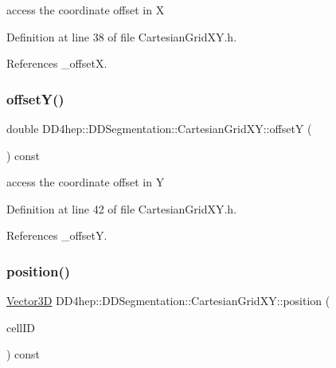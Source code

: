 access the coordinate offset in X 



Definition at line 38 of file Cartesian\+Grid\+X\+Y.\+h.



References \+\_\+offsetX.

\hypertarget{class_d_d4hep_1_1_d_d_segmentation_1_1_cartesian_grid_x_y_a15bb16821ada5d8f18048ebd1ae983a4}{}\label{class_d_d4hep_1_1_d_d_segmentation_1_1_cartesian_grid_x_y_a15bb16821ada5d8f18048ebd1ae983a4} 
\subsubsection{\texorpdfstring{offset\+Y()}{offsetY()}}
{\footnotesize\ttfamily double D\+D4hep\+::\+D\+D\+Segmentation\+::\+Cartesian\+Grid\+X\+Y\+::offsetY (\begin{DoxyParamCaption}{ }\end{DoxyParamCaption}) const\hspace{0.3cm}{\ttfamily [inline]}}



access the coordinate offset in Y 



Definition at line 42 of file Cartesian\+Grid\+X\+Y.\+h.



References \+\_\+offsetY.

\hypertarget{class_d_d4hep_1_1_d_d_segmentation_1_1_cartesian_grid_x_y_a699a4abe55b46d29e5a0d43fcb76b81c}{}\label{class_d_d4hep_1_1_d_d_segmentation_1_1_cartesian_grid_x_y_a699a4abe55b46d29e5a0d43fcb76b81c} 
\subsubsection{\texorpdfstring{position()}{position()}}
{\footnotesize\ttfamily \hyperlink{struct_d_d4hep_1_1_d_d_segmentation_1_1_vector3_d}{Vector3D} D\+D4hep\+::\+D\+D\+Segmentation\+::\+Cartesian\+Grid\+X\+Y\+::position (\begin{DoxyParamCaption}\item[{const \hyperlink{namespace_d_d4hep_1_1_d_d_segmentation_ac7af071d85cb48820914434a07e21ba1}{Cell\+ID} \&}]{cell\+ID }\end{DoxyParamCaption}) const\hspace{0.3cm}{\ttfamily [virtual]}}



